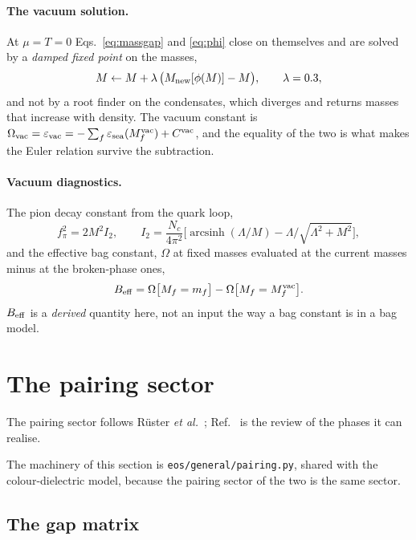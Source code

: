 \documentclass[aps,prc,onecolumn,superscriptaddress,nofootinbib,10pt]{revtex4-2}
\newcommand{\Lam}{\Lambda}
\begin{document}
\paragraph{The vacuum solution.} At $\mu = T = 0$ Eqs.~\eqref{eq:massgap} and
\eqref{eq:phi} close on themselves and are solved by a \emph{damped fixed
point} on the masses,
\begin{equation}
  M \leftarrow M + \lambda\,\big(M_{\rm new}[\phi(M)] - M\big), \qquad
  \lambda = 0.3 ,
\end{equation}
and not by a root finder on the condensates, which diverges and returns masses
that increase with density. The vacuum constant is
$\Omega_{\rm vac} = \varepsilon_{\rm vac}
= -\sum_f \varepsilon_{\rm sea}(M_f^{\rm vac}) + C^{\rm vac}$, and the equality
of the two is what makes the Euler relation survive the subtraction.

\paragraph{Vacuum diagnostics.} The pion decay constant from the quark loop,
\begin{equation}
  f_\pi^2 = 2 M^2 I_2 , \qquad
  I_2 = \frac{N_c}{4\pi^2}\Big[\operatorname{arcsinh}(\Lam/M)
        - \Lam/\sqrt{\Lam^2+M^2}\Big] ,
  \label{eq:fpi}
\end{equation}
and the effective bag constant, $\Omega$ at fixed masses evaluated at the
current masses minus at the broken-phase ones,
\begin{equation}
  B_{\rm eff} = \Omega\big[M_f = m_f\big] - \Omega\big[M_f = M_f^{\rm vac}\big] .
  \label{eq:Beff}
\end{equation}
$B_{\rm eff}$ is a \emph{derived} quantity here, not an input the way a bag
constant is in a bag model.

\section{The pairing sector}
\label{sec:pairing}

The pairing sector follows R\"uster \textit{et al.}~\cite{Ruester2005};
Ref.~\cite{Alford2008} is the review of the phases it can realise.

The machinery of this section is \texttt{eos/general/pairing.py}, shared with
the colour-dielectric model, because the pairing sector of the two is the same
sector.

\subsection{The gap matrix}
\label{sec:gapmatrix}
\end{document}
